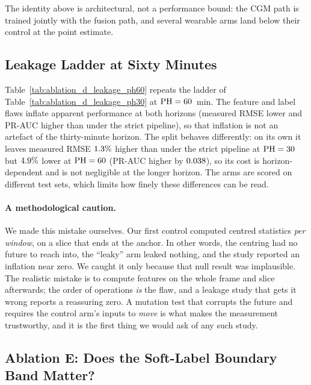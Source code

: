 The identity above is architectural, not a performance bound: the CGM path is
trained jointly with the fusion path, and several wearable arms land below their
control at the point estimate.

\subsection{Leakage Ladder at Sixty Minutes}
\label{sec:appendix_ablation_d}



Table~\ref{tab:ablation_d_leakage_ph60} repeats the ladder of
Table~\ref{tab:ablation_d_leakage_ph30} at $\mathrm{PH} = 60$~min. The feature and label
flaws inflate apparent performance at both horizons (measured RMSE lower and
PR-AUC higher than under the strict pipeline), so that inflation is not an
artefact of the thirty-minute horizon. The split behaves differently: on its own
it leaves measured RMSE $1.3\%$ higher than under the
strict pipeline at $\mathrm{PH} = 30$ but $4.9\%$
lower at $\mathrm{PH} = 60$ (PR-AUC higher by $0.038$),
so its cost is horizon-dependent and is not negligible at the longer horizon.
The arms are scored on different test sets, which limits how finely these
differences can be read.

\paragraph{A methodological caution.}
We made this mistake ourselves. Our first control computed centred statistics
\emph{per window}, on a slice that ends at the anchor. In other words, the
centring had no future to reach into, the ``leaky'' arm leaked nothing, and the
study reported an inflation near zero. We caught it only because that null result
was implausible. The realistic mistake is to compute
features on the whole frame and slice afterwards; the order of operations
\emph{is} the flaw, and a leakage study that gets it wrong reports a reassuring
zero. A mutation test that corrupts the future and requires the control arm's
inputs to \emph{move} is what makes the measurement trustworthy, and it is the
first thing we would ask of any such study.

\subsection{Ablation E: Does the Soft-Label Boundary Band Matter?}
\label{sec:ablation-e}

